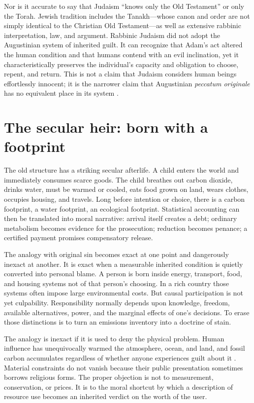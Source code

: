 ﻿\documentclass[12pt,a4paper]{book}
\begin{document}
Nor is it accurate to say that Judaism ``knows only the Old Testament'' or
only the Torah.  Jewish tradition includes the Tanakh---whose canon and order
are not simply identical to the Christian Old Testament---as well as extensive
rabbinic interpretation, law, and argument.  Rabbinic Judaism did not adopt
the Augustinian system of inherited guilt.  It can recognize that Adam's act
altered the human condition and that humans contend with an evil inclination,
yet it characteristically preserves the individual's capacity and obligation
to choose, repent, and return.  This is not a claim that Judaism considers
human beings effortlessly innocent; it is the narrower claim that
Augustinian \emph{peccatum originale} has no equivalent place in its system
\cite{HaymanRabbinicFall1984}.

\section{The secular heir: born with a footprint}

The old structure has a striking secular afterlife.  A child enters the world
and immediately consumes scarce goods.  The child breathes out carbon dioxide,
drinks water, must be warmed or cooled, eats food grown on land, wears clothes,
occupies housing, and travels.  Long before intention or choice, there is a
carbon footprint, a water footprint, an ecological footprint.  Statistical
accounting can then be translated into moral narrative: arrival itself creates
a debt; ordinary metabolism becomes evidence for the prosecution; reduction
becomes penance; a certified payment promises compensatory release.

The analogy with original sin becomes exact at one point and dangerously
inexact at another.  It is exact when a measurable inherited condition is
quietly converted into personal blame.  A person is born inside energy,
transport, food, and housing systems not of that person's choosing.  In a rich
country those systems often impose large environmental costs.  But causal
participation is not yet culpability.  Responsibility normally depends upon
knowledge, freedom, available alternatives, power, and the marginal effects of
one's decisions.  To erase those distinctions is to turn an emissions
inventory into a doctrine of stain.

The analogy is inexact if it is used to deny the physical problem.  Human
influence has unequivocally warmed the atmosphere, ocean, and land, and fossil
carbon accumulates regardless of whether anyone experiences guilt about it
\cite{IPCC2021HumanInfluence,IPCC2023Synthesis}.  Material constraints do not
vanish because their public presentation sometimes borrows religious forms.
The proper objection is not to measurement, conservation, or prices.  It is to
the moral shortcut by which a description of resource use becomes an inherited
verdict on the worth of the user.
\end{document}
